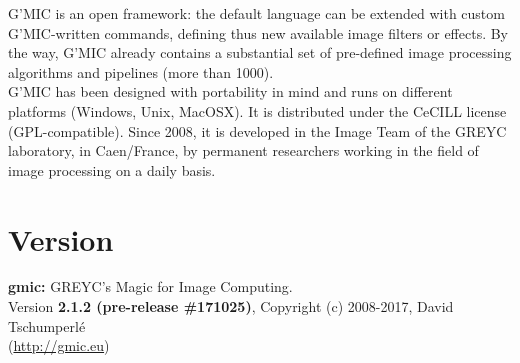\documentclass[a4paper,10.5pt,twoside]{book}
\newcommand{\Ca}[1]{\textcolor{ca}{#1}}
\newcommand{\Cb}[1]{\textcolor{cb}{#1}}
\newcommand{\Cc}[1]{\textcolor{cc}{#1}}
\begin{document}
\Cc{G'MIC} is an open framework: the default language can be extended with custom \Cc{G'MIC}-written commands, defining thus new available image filters or effects. By the way, \Cc{G'MIC} already contains a substantial set of pre-defined image processing algorithms and pipelines (more than 1000).\\ 
 
\Cc{G'MIC} has been designed with portability in mind and runs on different platforms (Windows, Unix, MacOSX). It is distributed under the CeCILL license (GPL-compatible). Since 2008, it is developed in the Image Team of the GREYC laboratory, in Caen/France, by permanent researchers working in the field of image processing on a daily basis. 
\section*{Version} 
 
 \Ca{\textbf{gmic:} GREYC's Magic for Image Computing.}\\ 
 
        \Cb{Version \textbf{2.1.2 (pre-release \#171025)}, Copyright (c) 2008-2017, David Tschumperl\'e}\\ 
        \Cb{(\url{http://gmic.eu})} 
\end{document}
